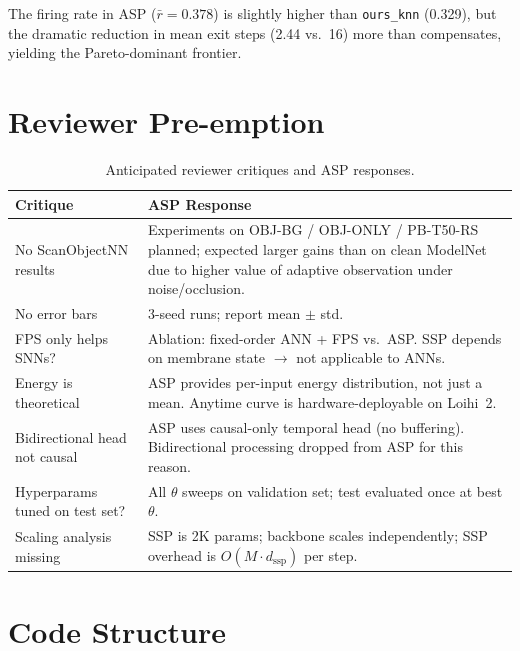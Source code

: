 \documentclass[11pt,a4paper]{article}
\begin{document}
The firing rate in ASP ($\bar{r}{=}0.378$) is slightly higher than
\texttt{ours\_knn} (0.329), but the dramatic reduction in mean exit steps
(2.44 vs.\ 16) more than compensates, yielding the Pareto-dominant frontier.

\section{Reviewer Pre-emption}

\begin{table}[H]
  \centering
  \caption{Anticipated reviewer critiques and ASP responses.}
  \label{tab:reviewer}
  \begin{tabular}{p{5.5cm}p{9cm}}
    \toprule
    \textbf{Critique} & \textbf{ASP Response} \\
    \midrule
    No ScanObjectNN results &
      Experiments on OBJ-BG / OBJ-ONLY / PB-T50-RS planned; expected larger
      gains than on clean ModelNet due to higher value of adaptive observation
      under noise/occlusion. \\[4pt]
    No error bars &
      3-seed runs; report mean $\pm$ std. \\[4pt]
    FPS only helps SNNs? &
      Ablation: fixed-order ANN + FPS vs.\ ASP. SSP depends on membrane
      state $\to$ not applicable to ANNs. \\[4pt]
    Energy is theoretical &
      ASP provides per-input energy distribution, not just a mean. Anytime
      curve is hardware-deployable on Loihi~2. \\[4pt]
    Bidirectional head not causal &
      ASP uses causal-only temporal head (no buffering). Bidirectional
      processing dropped from ASP for this reason. \\[4pt]
    Hyperparams tuned on test set? &
      All $\theta$ sweeps on validation set; test evaluated once at best $\theta$. \\[4pt]
    Scaling analysis missing &
      SSP is 2K params; backbone scales independently; SSP overhead is
      $O(M \cdot d_\text{ssp})$ per step. \\
    \bottomrule
  \end{tabular}
\end{table}

\section{Code Structure}
\end{document}
